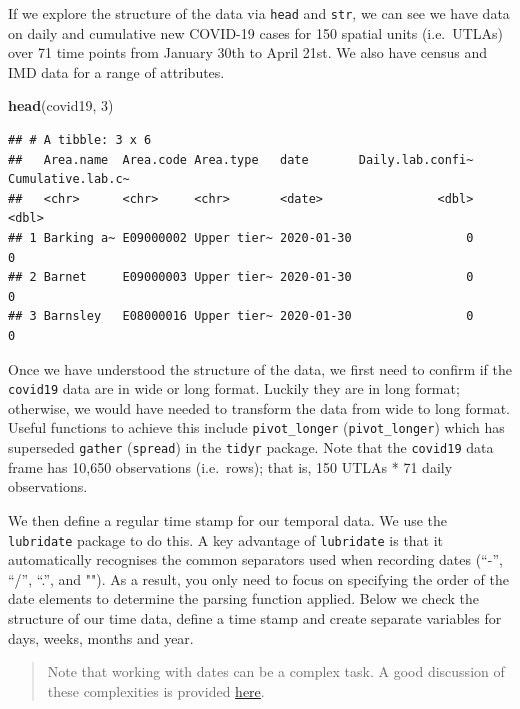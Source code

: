 \documentclass[
]{book}
\newenvironment{Shaded}{\begin{snugshade}}{\end{snugshade}}
\newcommand{\DecValTok}[1]{\textcolor[rgb]{0.00,0.00,0.81}{#1}}
\newcommand{\KeywordTok}[1]{\textcolor[rgb]{0.13,0.29,0.53}{\textbf{#1}}}
\newcommand{\NormalTok}[1]{#1}
\begin{document}
If we explore the structure of the data via \texttt{head} and \texttt{str}, we can see we have data on daily and cumulative new COVID-19 cases for 150 spatial units (i.e.~UTLAs) over 71 time points from January 30th to April 21st. We also have census and IMD data for a range of attributes.

\begin{Shaded}
\begin{Highlighting}[]
\KeywordTok{head}\NormalTok{(covid19, }\DecValTok{3}\NormalTok{)}
\end{Highlighting}
\end{Shaded}

\begin{verbatim}
## # A tibble: 3 x 6
##   Area.name  Area.code Area.type   date       Daily.lab.confi~ Cumulative.lab.c~
##   <chr>      <chr>     <chr>       <date>                <dbl>             <dbl>
## 1 Barking a~ E09000002 Upper tier~ 2020-01-30                0                 0
## 2 Barnet     E09000003 Upper tier~ 2020-01-30                0                 0
## 3 Barnsley   E08000016 Upper tier~ 2020-01-30                0                 0
\end{verbatim}

Once we have understood the structure of the data, we first need to confirm if the \texttt{covid19} data are in wide or long format. Luckily they are in long format; otherwise, we would have needed to transform the data from wide to long format. Useful functions to achieve this include \texttt{pivot\_longer} (\texttt{pivot\_longer}) which has superseded \texttt{gather} (\texttt{spread}) in the \texttt{tidyr} package. Note that the \texttt{covid19} data frame has 10,650 observations (i.e.~rows); that is, 150 UTLAs * 71 daily observations.

We then define a regular time stamp for our temporal data. We use the \texttt{lubridate} package to do this. A key advantage of \texttt{lubridate} is that it automatically recognises the common separators used when recording dates (``-'', ``/'', ``.'', and ""). As a result, you only need to focus on specifying the order of the date elements to determine the parsing function applied. Below we check the structure of our time data, define a time stamp and create separate variables for days, weeks, months and year.

\begin{quote}
Note that working with dates can be a complex task. A good discussion of these complexities is provided \href{http://uc-r.github.io/dates/\#convert_date}{here}.
\end{quote}
\end{document}
